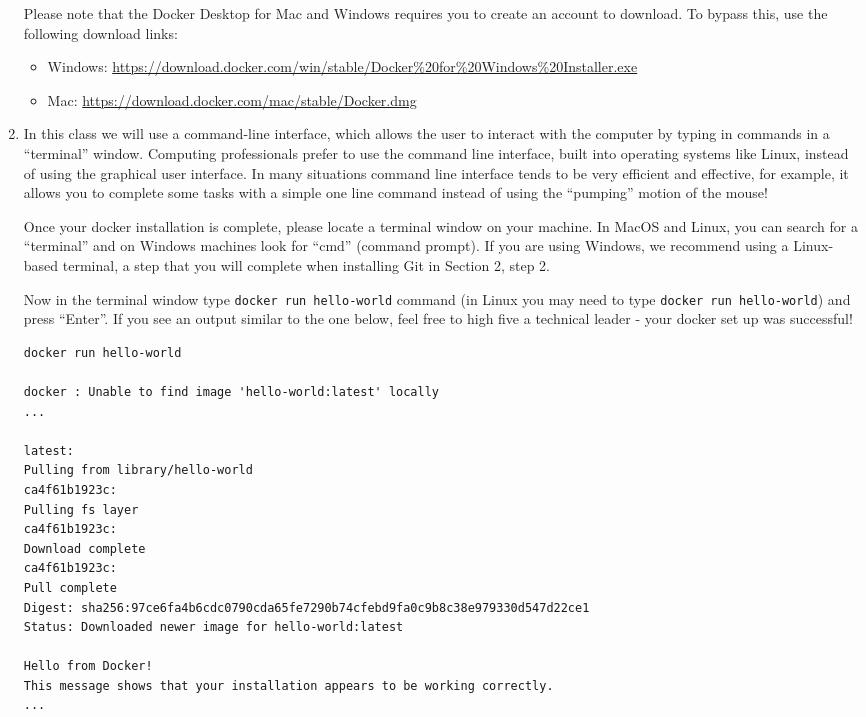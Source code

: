 \begin{enumerate}
 Please note that the Docker Desktop for Mac and Windows requires you to create an account to download. To bypass this, use the following download links:
	\begin{itemize}
		\item Windows: \url{ https://download.docker.com/win/stable/Docker%20for%20Windows%20Installer.exe}
		\item Mac: \url{ https://download.docker.com/mac/stable/Docker.dmg}
	\end{itemize}
	\item In this class we will use a command-line interface, which allows the user to interact with the computer by typing in commands in a ``terminal'' window. Computing professionals prefer to use the command line interface, built into operating systems like Linux, instead of using the graphical user interface. In many situations command line interface tends to be very efficient and effective, for example, it allows you to complete some tasks with a simple one line command instead of using the ``pumping'' motion of the mouse!
	
	Once your docker installation is complete, please locate a terminal window on your machine. In MacOS and Linux, you can search for a ``terminal'' and on Windows machines look for ``cmd'' (command prompt). If you are using Windows, we recommend using a Linux-based terminal, a step that you will complete when installing Git in Section 2, step 2. 
	
	Now in the terminal window type {\tt docker run hello-world} command (in Linux you may need to type {\tt docker run hello-world}) and press ``Enter''. If you see an output similar to the one below, feel free to high five a technical leader - your docker set up was successful!
	
	

\begin{verbatim}	
docker run hello-world

docker : Unable to find image 'hello-world:latest' locally
...

latest:
Pulling from library/hello-world
ca4f61b1923c:
Pulling fs layer
ca4f61b1923c:
Download complete
ca4f61b1923c:
Pull complete
Digest: sha256:97ce6fa4b6cdc0790cda65fe7290b74cfebd9fa0c9b8c38e979330d547d22ce1
Status: Downloaded newer image for hello-world:latest

Hello from Docker!
This message shows that your installation appears to be working correctly.
...
\end{verbatim}

\end{enumerate}

